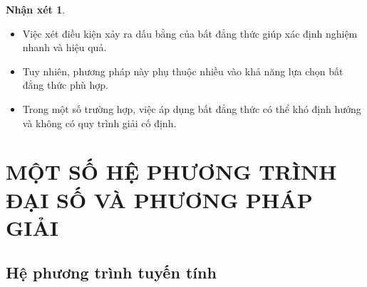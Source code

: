 \documentclass[12pt,a4paper,oneside]{book}
\theoremstyle{theorem}
\theoremstyle{definition}
\newtheorem{nx}[theorem2]{Nhận xét}
\begin{document}
    \begin{nx}
        \begin{itemize}
    \item Việc xét điều kiện xảy ra dấu bằng của bất đẳng thức giúp xác định nghiệm nhanh và hiệu quả.
    \item Tuy nhiên, phương pháp này phụ thuộc nhiều vào khả năng lựa chọn bất đẳng thức phù hợp.
    \item Trong một số trường hợp, việc áp dụng bất đẳng thức có thể khó định hướng và không có quy trình giải cố định.
\end{itemize}
    \end{nx}

   \chapter{MỘT SỐ HỆ PHƯƠNG TRÌNH ĐẠI SỐ VÀ PHƯƠNG PHÁP GIẢI}
    \section{Hệ phương trình tuyến tính}
\end{document}
